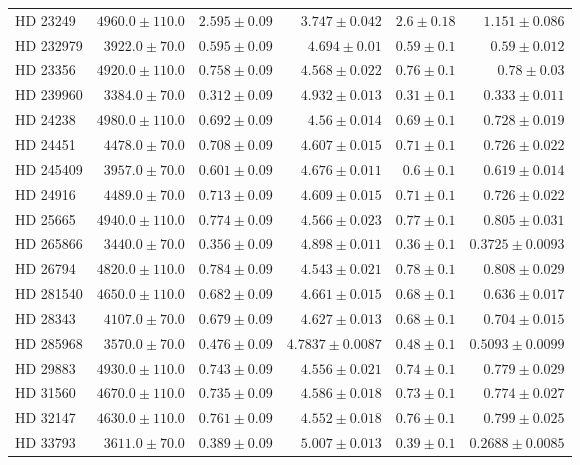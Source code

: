 \begin{longtable*}{lrrrrr}
HD 23249 & $4960.0\pm 110.0$ & $2.595\pm 0.09$ & $3.747\pm 0.042$ & $2.6\pm 0.18$ & $1.151\pm 0.086$ \\ 
HD 232979 & $3922.0\pm 70.0$ & $0.595\pm 0.09$ & $4.694\pm 0.01$ & $0.59\pm 0.1$ & $0.59\pm 0.012$ \\ 
HD 23356 & $4920.0\pm 110.0$ & $0.758\pm 0.09$ & $4.568\pm 0.022$ & $0.76\pm 0.1$ & $0.78\pm 0.03$ \\ 
HD 239960 & $3384.0\pm 70.0$ & $0.312\pm 0.09$ & $4.932\pm 0.013$ & $0.31\pm 0.1$ & $0.333\pm 0.011$ \\ 
HD 24238 & $4980.0\pm 110.0$ & $0.692\pm 0.09$ & $4.56\pm 0.014$ & $0.69\pm 0.1$ & $0.728\pm 0.019$ \\ 
HD 24451 & $4478.0\pm 70.0$ & $0.708\pm 0.09$ & $4.607\pm 0.015$ & $0.71\pm 0.1$ & $0.726\pm 0.022$ \\ 
HD 245409 & $3957.0\pm 70.0$ & $0.601\pm 0.09$ & $4.676\pm 0.011$ & $0.6\pm 0.1$ & $0.619\pm 0.014$ \\ 
HD 24916 & $4489.0\pm 70.0$ & $0.713\pm 0.09$ & $4.609\pm 0.015$ & $0.71\pm 0.1$ & $0.726\pm 0.022$ \\ 
HD 25665 & $4940.0\pm 110.0$ & $0.774\pm 0.09$ & $4.566\pm 0.023$ & $0.77\pm 0.1$ & $0.805\pm 0.031$ \\ 
HD 265866 & $3440.0\pm 70.0$ & $0.356\pm 0.09$ & $4.898\pm 0.011$ & $0.36\pm 0.1$ & $0.3725\pm 0.0093$ \\ 
HD 26794 & $4820.0\pm 110.0$ & $0.784\pm 0.09$ & $4.543\pm 0.021$ & $0.78\pm 0.1$ & $0.808\pm 0.029$ \\ 
HD 281540 & $4650.0\pm 110.0$ & $0.682\pm 0.09$ & $4.661\pm 0.015$ & $0.68\pm 0.1$ & $0.636\pm 0.017$ \\ 
HD 28343 & $4107.0\pm 70.0$ & $0.679\pm 0.09$ & $4.627\pm 0.013$ & $0.68\pm 0.1$ & $0.704\pm 0.015$ \\ 
HD 285968 & $3570.0\pm 70.0$ & $0.476\pm 0.09$ & $4.7837\pm 0.0087$ & $0.48\pm 0.1$ & $0.5093\pm 0.0099$ \\ 
HD 29883 & $4930.0\pm 110.0$ & $0.743\pm 0.09$ & $4.556\pm 0.021$ & $0.74\pm 0.1$ & $0.779\pm 0.029$ \\ 
HD 31560 & $4670.0\pm 110.0$ & $0.735\pm 0.09$ & $4.586\pm 0.018$ & $0.73\pm 0.1$ & $0.774\pm 0.027$ \\ 
HD 32147 & $4630.0\pm 110.0$ & $0.761\pm 0.09$ & $4.552\pm 0.018$ & $0.76\pm 0.1$ & $0.799\pm 0.025$ \\ 
HD 33793 & $3611.0\pm 70.0$ & $0.389\pm 0.09$ & $5.007\pm 0.013$ & $0.39\pm 0.1$ & $0.2688\pm 0.0085$ \\ 

\end{longtable*}
